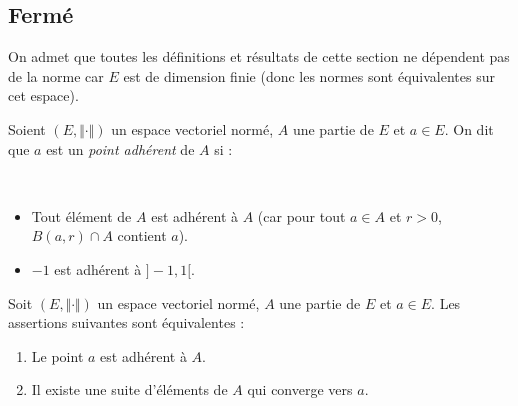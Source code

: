 \documentclass[french,11pt,twoside]{VcCours}
\begin{document}
\subsection{Fermé}

\begin{Theoreme}{} On admet que toutes les définitions et résultats de cette section ne dépendent pas de la norme car $E$ est de dimension finie (donc les normes sont équivalentes sur cet espace).
\end{Theoreme}


\begin{Definition}{} 
Soient $(E, \Vert \cdot \Vert)$ un espace vectoriel normé, $A$ une partie de $E$ et $a \in E$. On dit que $a$ est un \emph{point adhérent} de $A$ si :

\vspace*{0.5cm}~
%
\end{Definition}

\begin{Remarques}{}
\begin{itemize} 
\item Tout élément de $A$ est adhérent à $A$ (car pour tout $a \in A$ et $r>0$, $B(a,r) \cap A$ contient $a$).
\item $-1$ est adhérent à $]-1,1[$.
\end{itemize}
\end{Remarques}{}

\begin{Proposition}{} Soit $(E, \Vert \cdot \Vert)$ un espace vectoriel normé, $A$ une partie de $E$ et $a \in E$. Les assertions suivantes sont équivalentes :

\begin{enumerate}
\item Le point $a$ est adhérent à $A$.
\item Il existe une suite d'éléments de $A$ qui converge vers $a$.
\end{enumerate}
\end{Proposition}
\end{document}
